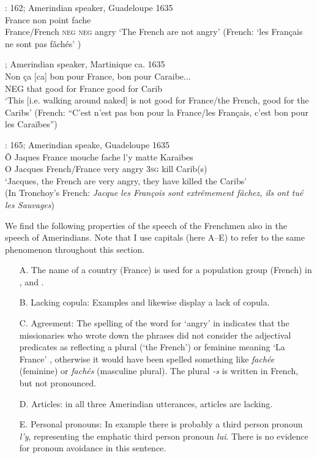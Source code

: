 \documentclass[output=paper,colorlinks,citecolor=brown]{langscibook}
\begin{document}
\ea%
\label{ex:bakker:3}
\citet{Tronchoy1709}: 162; Amerindian speaker, Guadeloupe 1635\\
 France non point fache \\
        France/French \textsc{neg} \textsc{neg} angry
\glt `The French are not angry'
    (French: `les Français ne sont pas fâchés' )
\z


\ea%
\citet[109]{Bouton1640}; Amerindian speaker, Martinique ca. 1635
\label{ex:bakker:4}\\
\gll Non ça [ca] bon pour France, bon pour Caraibe... \\
    \textsc{NEG} that good for France good for Carib\\
\glt `This [i.e. walking around naked] is not good for France/the French, good for the Caribs'
(French: “C'est n'est pas bon pour la France/les Français, c’est bon pour les Caraïbes”)
\z

\ea %
    \citet{Tronchoy1709}: 165; Amerindian speake, Guadeloupe 1635\\
\label{ex:bakker:5}
    \gll Ô Jaques France mouche fache l’y matte Karaibes\\
O Jacques French/France very angry 3\textsc{sg} kill Carib(s)\\
    \glt `Jacques, the French are very angry, they have killed the Caribs' \\
(In Tronchoy’s French: \textit{Jacque les François sont extrêmement fâchez, ils ont tué les Sauvages})
\z



We find the following properties of the speech of the Frenchmen also in the speech of Amerindians. Note that I use capitals (here A–E) to refer to the same phenomenon throughout this section.

\ea %
\begin{itemize}
\label{ex:bakker:6}
    \item[A.] The name of a country (France) is used for a population group (French) in ,  and .
    \item[B.] Lacking copula: Examples   and  likewise display a lack of copula.
    \item[C.] Agreement: The spelling of the word for `angry'
in  indicates that the missionaries who wrote down the phrases did not consider the adjectival predicates as reflecting a plural (`the French') or feminine meaning `La France' , otherwise it would have been spelled something like \textit{fachée} (feminine) or \textit{fachés} (masculine plural). The plural \textit{-s} is written in French, but not pronounced.
\item[D.] Articles: in all three Amerindian utterances, articles are lacking.
\item[E.] Personal pronouns: In example  there is probably a third person pronoun \textit{l’y}, representing the emphatic third person pronoun \textit{lui}. There is no evidence for pronoun avoidance in this sentence.
\end{itemize}
\z
\end{document}
